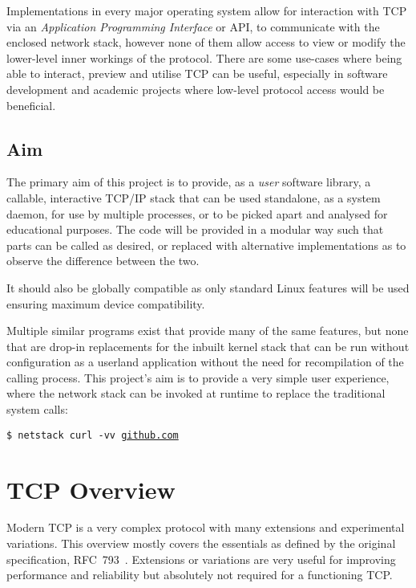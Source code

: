\documentclass[11pt,a4paper,british]{bhamarticle}
\begin{document}
\begin{multicols}{2}
Implementations in every major operating system allow for interaction with TCP via an \textit{Application Programming Interface} or API, to communicate with the enclosed network stack, however none of them allow access to view or modify the lower-level inner workings of the protocol. There are some use-cases where being able to interact, preview and utilise TCP can be useful, especially in software development and academic projects where low-level protocol access would be beneficial.

\subsection{Aim}\label{sec:aim}
The primary aim of this project is to provide, as a \textit{user} software library, a callable, interactive TCP/IP stack that can be used standalone, as a system daemon, for use by multiple processes, or to be picked apart and analysed for educational purposes. The code will be provided in a modular way such that parts can be called as desired, or replaced with alternative implementations as to observe the difference between the two.

It should also be globally compatible as only standard Linux features will be used ensuring maximum device compatibility.

Multiple similar programs exist that provide many of the same features, but none that are drop-in replacements for the inbuilt kernel stack that can be run without configuration as a userland application without the need for recompilation of the calling process. This project's aim is to provide a very simple user experience, where the network stack can be invoked at runtime to replace the traditional system calls:

\begin{center}
    \texttt{\$ netstack curl -vv \url{github.com}}
\end{center}

\section{TCP Overview}
Modern TCP is a very complex protocol with many extensions and experimental variations. This overview mostly covers the essentials as defined by the original specification, RFC~793~\cite{rfc793}. Extensions or variations are very useful for improving performance and reliability but absolutely not required for a functioning TCP. %


\end{multicols}
\end{document}
